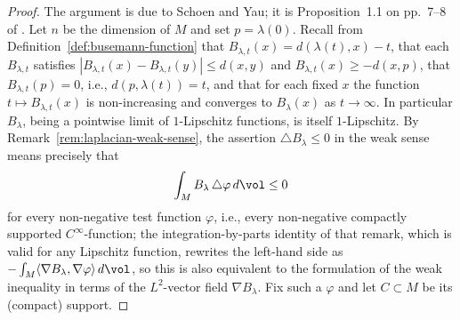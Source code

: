 \begin{proof}
The argument is due to Schoen and Yau; it is Proposition~1.1 on
pp.~7--8 of \cite{SchoenYau}. Let $n$ be the dimension of $M$ and
set $p=\lambda(0)$. Recall from
Definition~\ref{def:busemann-function} that
$B_{\lambda,t}(x)=d(\lambda(t),x)-t$, that each $B_{\lambda,t}$
satisfies $|B_{\lambda,t}(x)-B_{\lambda,t}(y)|\le d(x,y)$ and
$B_{\lambda,t}(x)\ge-d(x,p)$, that $B_{\lambda,t}(p)=0$, i.e.,
$d(p,\lambda(t))=t$, and that for each fixed $x$ the function
$t\mapsto B_{\lambda,t}(x)$ is non-increasing and converges to
$B_\lambda(x)$ as $t\to\infty$. In particular $B_\lambda$, being a
pointwise limit of $1$-Lipschitz functions, is itself
$1$-Lipschitz. By Remark~\ref{rem:laplacian-weak-sense}, the
assertion $\triangle B_\lambda\le0$ in the weak sense means
precisely that
$$\int_MB_\lambda\,\triangle\varphi\,d\vol\le0$$
for every non-negative test function $\varphi$, i.e., every
non-negative compactly supported $C^\infty$-function; the
integration-by-parts identity of that remark, which is valid for
any Lipschitz function, rewrites the left-hand side as
$-\int_M\langle\nabla B_\lambda,\nabla\varphi\rangle\,d\vol$, so
this is also equivalent to the formulation of the weak inequality
in terms of the $L^2$-vector field $\nabla B_\lambda$. Fix such a
$\varphi$ and let $C\subset M$ be its (compact) support.


\end{proof}
